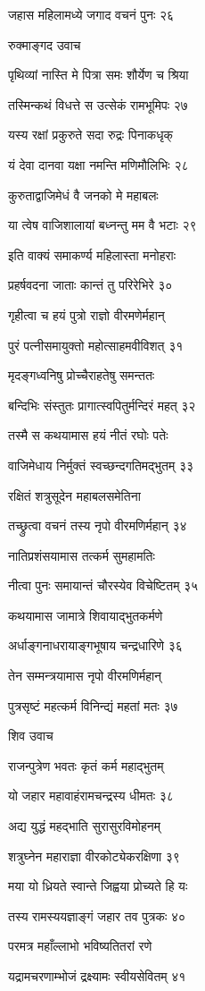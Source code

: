 जहास महिलामध्ये जगाद वचनं पुनः २६

रुक्माङ्गद उवाच

पृथिव्यां नास्ति मे पित्रा समः शौर्येण च श्रिया

तस्मिन्कथं विधत्ते स उत्सेकं रामभूमिपः २७

यस्य रक्षां प्रकुरुते सदा रुद्रः पिनाकधृक्

यं देवा दानवा यक्षा नमन्ति मणिमौलिभिः २८

कुरुताद्वाजिमेधं वै जनको मे महाबलः

या त्वेष वाजिशालायां बध्नन्तु मम वै भटाः २९

इति वाक्यं समाकर्ण्य महिलास्ता मनोहराः

प्रहर्षवदना जाताः कान्तं तु परिरेभिरे ३०

गृहीत्वा च हयं पुत्रो राज्ञो वीरमणेर्महान्

पुरं पत्नीसमायुक्तो महोत्साहमवीविशत् ३१

मृदङ्गध्वनिषु प्रोच्चैराहतेषु समन्ततः

बन्दिभिः संस्तुतः प्रागात्स्वपितुर्मन्दिरं महत् ३२

तस्मै स कथयामास हयं नीतं रघोः पतेः

वाजिमेधाय निर्मुक्तं स्वच्छन्दगतिमद्भुतम् ३३

रक्षितं शत्रुसूदेन महाबलसमेतिना

तच्छ्रुत्वा वचनं तस्य नृपो वीरमणिर्महान् ३४

नातिप्रशंसयामास तत्कर्म सुमहामतिः

नीत्वा पुनः समायान्तं चौरस्येव विचेष्टितम् ३५

कथयामास जामात्रे शिवायाद्भुतकर्मणे

अर्धाङ्गनाधरायाङ्गभूषाय चन्द्रधारिणे ३६

तेन सम्मन्त्रयामास नृपो वीरमणिर्महान्

पुत्रसृष्टं महत्कर्म विनिन्द्यं महतां मतः ३७

शिव उवाच

राजन्पुत्रेण भवतः कृतं कर्म महाद्भुतम्

यो जहार महावाहंरामचन्द्रस्य धीमतः ३८

अद्य युद्धं महद्भाति सुरासुरविमोहनम्

शत्रुघ्नेन महाराज्ञा वीरकोट्येकरक्षिणा ३९

मया यो ध्रियते स्वान्ते जिह्वया प्रोच्यते हि यः

तस्य रामस्ययज्ञाङ्गं जहार तव पुत्रकः ४०

परमत्र महाँल्लाभो भविष्यतितरां रणे

यद्रामचरणाम्भोजं द्रक्ष्यामः स्वीयसेवितम् ४१

